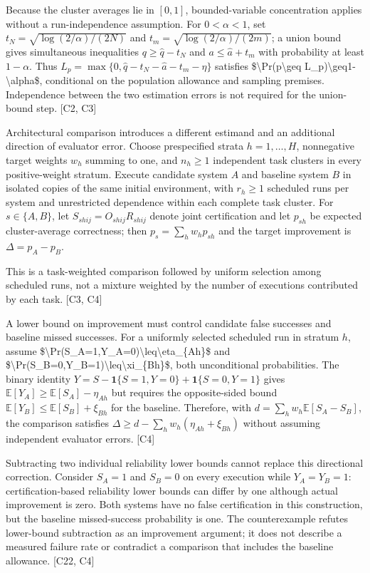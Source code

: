 \documentclass[11pt]{article}
\begin{document}
Because the cluster averages lie in $[0,1]$, bounded-variable concentration applies without a run-independence assumption. For $0<\alpha<1$, set $t_N=\sqrt{\log(2/\alpha)/(2N)}$ and $t_m=\sqrt{\log(2/\alpha)/(2m)}$; a union bound gives simultaneous inequalities $q\geq\widehat q-t_N$ and $a\leq\widehat a+t_m$ with probability at least $1-\alpha$. Thus $L_p=\max\{0,\widehat q-t_N-\widehat a-t_m-\eta\}$ satisfies \$\textbackslash{}Pr(p\textbackslash{}geq L\_p)\textbackslash{}geq1-\textbackslash{}alpha\$, conditional on the population allowance and sampling premises. Independence between the two estimation errors is not required for the union-bound step. [C2, C3]

Architectural comparison introduces a different estimand and an additional direction of evaluator error. Choose prespecified strata $h=1,\ldots,H$, nonnegative target weights $w_h$ summing to one, and $n_h\geq1$ independent task clusters in every positive-weight stratum. Execute candidate system $A$ and baseline system $B$ in isolated copies of the same initial environment, with $r_h\geq1$ scheduled runs per system and unrestricted dependence within each complete task cluster. For $s\in\{A,B\}$, let $S_{shij}=O_{shij}R_{shij}$ denote joint certification and let $p_{sh}$ be expected cluster-average correctness; then $p_s=\sum_h w_hp_{sh}$ and the target improvement is $\Delta=p_A-p_B$.

This is a task-weighted comparison followed by uniform selection among scheduled runs, not a mixture weighted by the number of executions contributed by each task. [C3, C4]

A lower bound on improvement must control candidate false successes and baseline missed successes. For a uniformly selected scheduled run in stratum $h$, assume \$\textbackslash{}Pr(S\_A=1,Y\_A=0)\textbackslash{}leq\textbackslash{}eta\_\{Ah\}\$ and \$\textbackslash{}Pr(S\_B=0,Y\_B=1)\textbackslash{}leq\textbackslash{}xi\_\{Bh\}\$, both unconditional probabilities. The binary identity $Y=S-\mathbf{1}\{S=1,Y=0\}+\mathbf{1}\{S=0,Y=1\}$ gives $\mathbb{E}[Y_A]\geq\mathbb{E}[S_A]-\eta_{Ah}$ but requires the opposite-sided bound $\mathbb{E}[Y_B]\leq\mathbb{E}[S_B]+\xi_{Bh}$ for the baseline. Therefore, with $d=\sum_h w_h\mathbb{E}[S_A-S_B]$, the comparison satisfies $\Delta\geq d-\sum_h w_h(\eta_{Ah}+\xi_{Bh})$ without assuming independent evaluator errors. [C4]

Subtracting two individual reliability lower bounds cannot replace this directional correction. Consider $S_A=1$ and $S_B=0$ on every execution while $Y_A=Y_B=1$: certification-based reliability lower bounds can differ by one although actual improvement is zero. Both systems have no false certification in this construction, but the baseline missed-success probability is one. The counterexample refutes lower-bound subtraction as an improvement argument; it does not describe a measured failure rate or contradict a comparison that includes the baseline allowance. [C22, C4]
\end{document}
